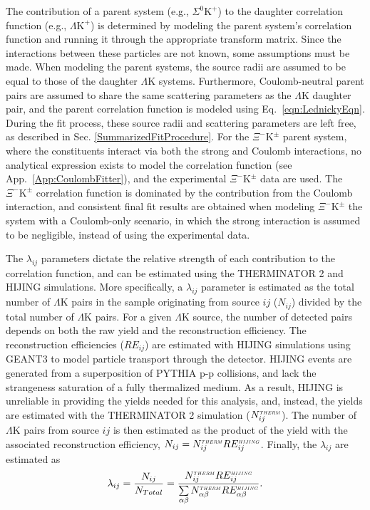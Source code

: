 \documentclass[ALICE,manyauthors]{cernphprep}
\newcommand{\KchP}{$\mathrm{K^{+}}$\xspace}
\newcommand{\LamK}{$\Lambda$K\xspace}
\newcommand{\LamKchP}{$\Lambda\mathrm{K^{+}}$\xspace}
\newcommand{\XiKpm}{$\Xi^{-}\mathrm{K^{\pm}}$\xspace}
\begin{document}
The contribution of a parent system (e.g., $\Sigma^{0}$\KchP) to the daughter correlation function (e.g., \LamKchP) is determined by modeling the parent system's correlation function and running it through the appropriate transform matrix.
Since the interactions between these particles are not known, some assumptions must be made.
When modeling the parent systems, the source radii are assumed to be equal to those of the daughter \LamK systems.
Furthermore, Coulomb-neutral parent pairs are assumed to share the same scattering parameters as the \LamK daughter pair, and the parent correlation function is modeled using Eq.\ \ref{eqn:LednickyEqn}.
During the fit process, these source radii and scattering parameters are left free, as described in Sec. \ref{SummarizedFitProcedure}.
For the \XiKpm parent system, where the constituents interact via both the strong and Coulomb interactions, no analytical expression exists to model the correlation function (see App.\ \ref{App:CoulombFitter}), and the experimental \XiKpm data are used.
The \XiKpm correlation function is dominated by the contribution from the Coulomb interaction, and consistent final fit results are obtained when modeling \XiKpm the system with a Coulomb-only scenario, in which the strong interaction is assumed to be negligible, instead of using the experimental data.



The $\lambda_{ij}$ parameters dictate the relative strength of each contribution to the correlation function, and can be estimated using the THERMINATOR 2 and HIJING simulations.
More specifically, a $\lambda_{ij}$ parameter is estimated as the total number of \LamK pairs in the sample originating from source $ij$ ($N_{ij}$) divided by the total number of \LamK pairs.
For a given \LamK source, the number of detected pairs depends on both the raw yield and the reconstruction efficiency.
The reconstruction efficiencies ($RE_{ij}$) are estimated with HIJING simulations using GEANT3 to model particle transport through the detector.
HIJING events are generated from a superposition of PYTHIA p-p collisions, and lack the strangeness saturation of a fully thermalized medium.
As a result, HIJING is unreliable in providing the yields needed for this analysis, and, instead, the yields are estimated with the THERMINATOR 2 simulation ($N_{ij}^{\scaleto{THERM}{3pt}}$).
The number of \LamK pairs from source $ij$ is then estimated as the product of the yield with the associated reconstruction efficiency, $N_{ij} = N_{ij}^{\scaleto{THERM}{3pt}}RE_{ij}^{\scaleto{HIJING}{3pt}}$.
Finally, the $\lambda_{ij}$ are estimated as
\begin{equation}
\lambda_{ij} = \frac{N_{ij}}{N_{Total}} = \frac{N_{ij}^{\scaleto{THERM}{3pt}}RE_{ij}^{\scaleto{HIJING}{3pt}}}{\sum\limits_{\alpha\beta} N_{\alpha\beta}^{\scaleto{THERM}{3pt}}RE_{\alpha\beta}^{\scaleto{HIJING}{3pt}}}.
\end{equation}
\end{document}
